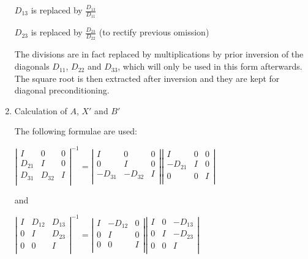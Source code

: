 \begin{enumerate}
$D_{13}$ is replaced by $\frac{D_{13}}{D_{11}}$

$D_{23}$ is replaced by $\frac{D_{23}}{D_{22}}$ (to rectify previous omission)

The divisions are in fact replaced by multiplications by prior inversion of the
diagonals $D_{11}$, $D_{22}$ and $D_{33}$, which will only be used in this form
afterwards.  The square root is then extracted after inversion and they are
kept for diagonal preconditioning.

\item Calculation of $A$, $X'$ and $B'$

The following formulae are used:

$
\left|\begin{array}{ccc}
  I & 0 & 0 \\
  D_{21} & I & 0 \\
  D_{31} & D_{32} & I \\
\end{array}\right|
^{-1}
=
\left|\begin{array}{ccc}
  I & 0 & 0 \\
  0 & I & 0 \\
  -D_{31} & -D_{32} & I \\
\end{array}\right|
\left|\begin{array}{ccc}
  I & 0 & 0 \\
  -D_{21} & I & 0 \\
  0 & 0 & I \\
\end{array}\right|
$

and

$
\left|\begin{array}{ccc}
  I & D_{12} & D_{13} \\
  0 & I & D_{23} \\
  0 & 0 & I \\
\end{array}\right|
^{-1}
=
\left|\begin{array}{ccc}
  I & -D_{12} & 0 \\
  0 & I & 0 \\
  0 &  0& I \\
\end{array}\right|
\left|\begin{array}{ccc}
  I & 0 & -D_{13} \\
  0 & I & -D_{23} \\
  0 & 0 & I \\
\end{array}\right|
$


\end{enumerate}
